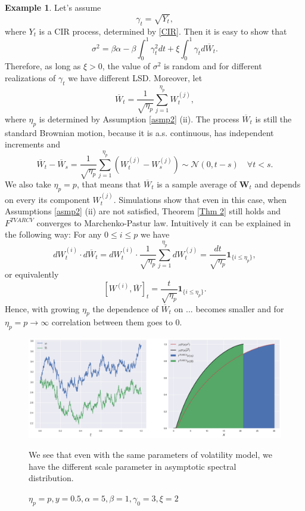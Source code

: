 \documentclass[a4paper,11pt]{article}
\theoremstyle{plain}
\theoremstyle{definition}
\newtheorem{exmp}[thm]{Example}
\begin{document}
    \begin{exmp} \label{SimCIR}
    	Let's assume
    	\[ \gamma_t = \sqrt{Y_t}, \]
    	where $Y_t$ is a CIR process, determined by \eqref{CIR}. Then it is easy to show that
    	\[ \sigma^2 = \beta\alpha - \beta\int_{0}^{1} \gamma_t^2dt + \xi \int_{0}^{1} \gamma_t d\overline{W}_t.\]
    	Therefore, as long as $\xi > 0$, the value of $\sigma^2$ is random and for different realizations of $\gamma_t$ we have different LSD.
    	Moreover, let
    	\[ \overline{W}_t = \frac{1}{\sqrt{\eta_p}} \sum_{j=1}^{\eta_p}W_t^{(j)}, \]
    	where $\eta_p$ is determined by Assumption \ref{asmp2} (ii). The process $\overline{W}_t$ is still the standard Brownian motion, because it is a.s. continuous, has independent increments and
    	\[ \overline{W}_t - \overline{W}_s = \frac{1}{\sqrt{\eta_p}} \sum_{j=1}^{\eta_p}(W_t^{(j)}-W_s^{(j)}) \sim \mathcal{N}(0, t-s) \quad \forall t < s. \]
    	We also take $\eta_p = p$, that means that $\overline{W}_t$ is a sample average of $\mathbf{W}_t$ and depends on every its component $W_t^{(j)}$. Simulations show that even in this case, when Assumptions \ref{asmp2} (ii) are not satisfied, Theorem \ref{Thm 2} still holds and $F^{TVARCV}$ converges to Marchenko-Pastur law. Intuitively it can be explained in the following way:
    	For any $0 \leq i \leq p$ we have
    	\[ dW_t^{(i)}\cdot d\overline{W}_t = dW_t^{(i)} \cdot \frac{1}{\sqrt{\eta_p}} \sum_{j=1}^{\eta_p}dW_t^{(j)} = \frac{dt}{\sqrt{\eta_p}} \mathbf{1}_{\{i \leq \eta_p\}}, \]
    	or equivalently 
    	\[ [W^{(i)}, \overline{W}]_t =  \frac{t}{\sqrt{\eta_p}} \mathbf{1}_{\{i \leq \eta_p\}}.  \]
    	Hence, with growing $\eta_p$ the dependence of $\overline{W}_t$ on ... becomes smaller and for $\eta_p = p \rightarrow \infty$ correlation between them goes to $0$.
    \end{exmp}
    
    \begin{figure}
    	\begin{center} \centering
    		\includegraphics[scale=0.4]{XCIR}
    		\caption{$\eta_p = p, y = 0.5, \alpha = 5, \beta = 1, \gamma_0 = 3, \xi = 2$}
    		\smallskip
    		\small
    		We see that even with the same parameters of volatility model, we have the different scale parameter in asymptotic spectral distribution.
    	\end{center}
    \end{figure}
    
\end{document}
